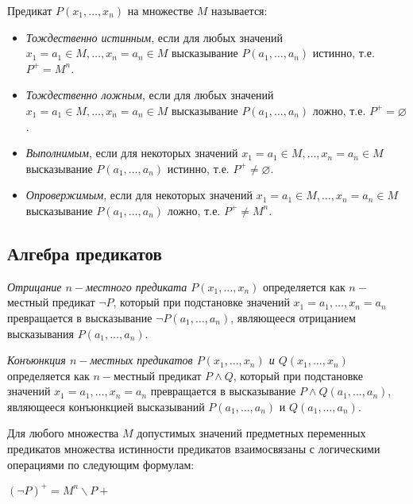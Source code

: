 \begin{definition}
    Предикат $P(x_1,\ldots,x_n)$ на множестве $M$ называется:

    \begin{itemize}
        \item \textit{Тождественно истинным}, если для любых значений $x_1=a_1\in M,\ldots,x_n=a_n \in M$ высказывание $P(a_1,\ldots,a_n)$ истинно, т.е. $P^+=M^n$.
        \item \textit{Тождественно ложным}, если для любых значений $x_1=a_1 \in M,\ldots,x_n=a_n \in M$ высказывание $P(a_1,\ldots,a_n)$ ложно, т.е. $P^+=\varnothing$.
        \item \textit{Выполнимым}, если для некоторых значений $x_1=a_1 \in M,\ldots,x_n=a_n \in M$ высказывание $P(a_1,\ldots,a_n)$ истинно, т.е. $P^+\neq \varnothing$.
        \item \textit{Опровержимым}, если для некоторых значений $x_1=a_1 \in M,\ldots,x_n=a_n \in M$ высказывание $P(a_1,\ldots,a_n)$ ложно, т.е. $P^+\neq M^n$.
    \end{itemize}
\end{definition}

\subsection*{Алгебра предикатов}
\begin{definition}
    \textit{Отрицание $n-$местного предиката $P(x_1,\ldots,x_n)$} определяется как $n-$местный предикат $\lnot P$, который при подстановке значений $x_1=a_1,\ldots,x_n=a_n$ превращается в высказывание $\lnot P(a_1,\ldots,a_n)$, являющееся отрицанием высказывания ${P(a_1,\ldots,a_n)}$.
\end{definition}

\begin{definition}
    \textit{Конъюнкция $n-$местных предикатов $P(x_1,\ldots,x_n)$ и $Q(x_1,\ldots,x_n)$} определяется как $n-$местный предикат $P\land Q$, который при подстановке значений $x_1=a_1,\ldots,x_n=a_n$ превращается в высказывание $P\land Q(a_1,\ldots,a_n)$, являющееся конъюнкцией высказываний $P(a_1,\ldots,a_n)$ и $Q(a_1,\ldots,a_n)$.
\end{definition}

Для любого множества $M$ допустимых значений предметных переменных предикатов множества истинности предикатов взаимосвязаны с логическими операциями по следующим формулам:

$(\lnot P)^+=M^n \backslash P+$

